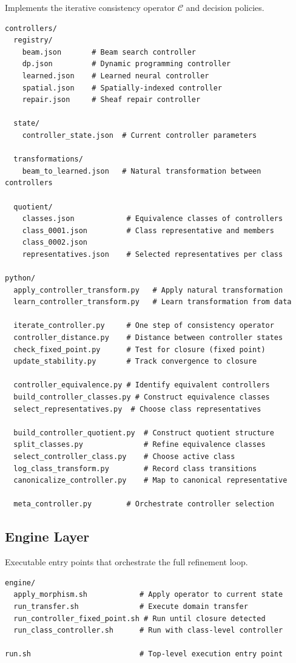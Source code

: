 \documentclass[12pt, oneside]{article}
\begin{document}
Implements the iterative consistency operator $\mathcal{C}$ and decision policies.
\begin{verbatim}
controllers/
  registry/
    beam.json       # Beam search controller
    dp.json         # Dynamic programming controller
    learned.json    # Learned neural controller
    spatial.json    # Spatially-indexed controller
    repair.json     # Sheaf repair controller

  state/
    controller_state.json  # Current controller parameters

  transformations/
    beam_to_learned.json   # Natural transformation between controllers

  quotient/
    classes.json            # Equivalence classes of controllers
    class_0001.json         # Class representative and members
    class_0002.json
    representatives.json    # Selected representatives per class

python/
  apply_controller_transform.py   # Apply natural transformation
  learn_controller_transform.py   # Learn transformation from data

  iterate_controller.py     # One step of consistency operator
  controller_distance.py    # Distance between controller states
  check_fixed_point.py      # Test for closure (fixed point)
  update_stability.py       # Track convergence to closure

  controller_equivalence.py # Identify equivalent controllers
  build_controller_classes.py # Construct equivalence classes
  select_representatives.py  # Choose class representatives

  build_controller_quotient.py  # Construct quotient structure
  split_classes.py              # Refine equivalence classes
  select_controller_class.py    # Choose active class
  log_class_transform.py        # Record class transitions
  canonicalize_controller.py    # Map to canonical representative

  meta_controller.py        # Orchestrate controller selection
\end{verbatim}

\subsection{Engine Layer}

Executable entry points that orchestrate the full refinement loop.
\begin{verbatim}
engine/
  apply_morphism.sh            # Apply operator to current state
  run_transfer.sh              # Execute domain transfer
  run_controller_fixed_point.sh # Run until closure detected
  run_class_controller.sh      # Run with class-level controller

run.sh                         # Top-level execution entry point
\end{verbatim}
\end{document}
